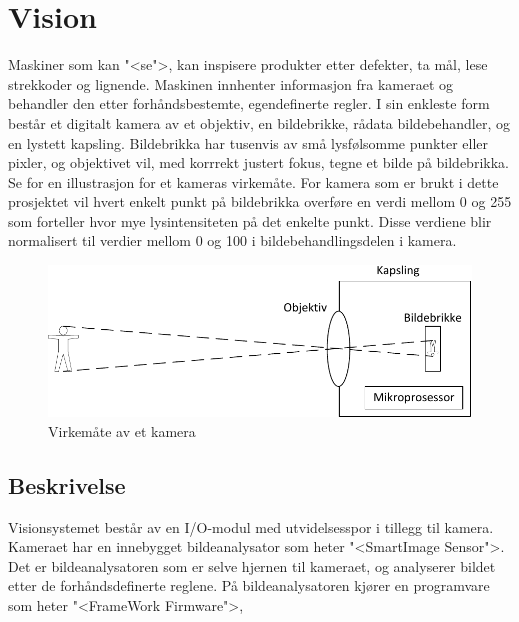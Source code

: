 \documentclass[Visionprosjekt.tex]{subfiles}
\begin{document}
\section{Vision}
Maskiner som kan "<se">, kan inspisere produkter etter defekter, ta mål, lese strekkoder og lignende.  Maskinen innhenter informasjon fra kameraet og behandler den etter forhåndsbestemte, egendefinerte regler. I sin enkleste form består et digitalt kamera av et objektiv, en bildebrikke, rådata bildebehandler, og en lystett kapsling. Bildebrikka har tusenvis av små lysfølsomme punkter eller pixler, og objektivet vil, med korrrekt justert fokus, tegne et bilde på bildebrikka. Se  for en illustrasjon for et kameras virkemåte. For kamera som er brukt i dette prosjektet vil hvert enkelt punkt på bildebrikka overføre en verdi mellom 0 og 255 som forteller hvor mye lysintensiteten på det enkelte punkt. Disse verdiene blir normalisert til verdier mellom 0 og 100 i bildebehandlingsdelen i kamera.

\begin{figure}[ht]
	\centering
		\includegraphics{bilder/kamera}
	\caption{Virkemåte av et kamera}
    \label{fig:kamera}
\end{figure}


\subsection{Beskrivelse}
Visionsystemet består av en I/O-modul med utvidelsesspor i tillegg til kamera. Kameraet har en innebygget bildeanalysator som heter "<SmartImage Sensor">. Det er bildeanalysatoren som er selve hjernen til kameraet, og analyserer bildet etter de forhåndsdefinerte reglene. På bildeanalysatoren kjører en programvare som heter "<FrameWork Firmware">, 
\end{document}
